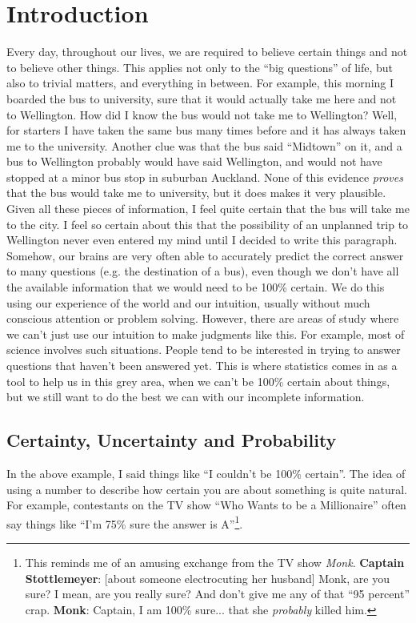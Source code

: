 \chapter{Introduction}
Every day, throughout our lives, we are required 
to believe certain things and not to believe other things. This applies not
only to the ``big questions'' of life, but also to trivial matters, and 
everything in between. For example, this morning I boarded the bus to 
university, sure that it would actually take me here and not to Wellington.
How did I know the bus would not take me to Wellington? Well, for starters
I have taken the same bus many times before and it has always taken me to the
university. Another clue was that the bus said ``Midtown'' on it, and a bus
to Wellington probably would have said Wellington, and would not have stopped
at a minor bus stop in suburban Auckland.
None of this evidence {\it proves} that the bus would take me to university,
but it does makes it very plausible. Given all these pieces of information, I feel
quite certain that the bus will take me to the city. I feel so certain
about this that the possibility of an
unplanned trip to Wellington never even entered my mind until I decided to
write this paragraph.\\

Somehow, our brains are very often able to accurately predict the correct answer
to many questions (e.g. the destination of a bus), even though we don't have
all the available information that we would need to be 100\% certain.
We do this using our experience of the world and our intuition, usually 
without much conscious attention or problem solving. However, there are areas
of study where we can't just use our intuition to make judgments like this.
For example, most of science involves such situations. People tend to be
interested in trying to answer questions that haven't been answered yet.
This is where statistics comes in as a tool to help us in this grey area, when we can't
be 100\% certain about things, but we still want to do the best we can with our
incomplete information.\\

\section{Certainty, Uncertainty and Probability}
In the above example, I said things like ``I couldn't be 100\% certain''. The
idea of using a number to describe how certain you are about something is quite natural.
For example, contestants on the TV show ``Who Wants to be a Millionaire'' often say things
like ``I'm 75\% sure the answer is A''\footnote{This reminds me of an amusing
exchange from the TV show {\it Monk}. {\bf Captain Stottlemeyer}: [about someone electrocuting her husband] Monk, are you sure? I mean, are you really sure? And don't give me any of that ``95 percent'' crap.
{\bf Monk}: Captain, I am 100\% sure... that she {\it probably} killed him.}.\\

